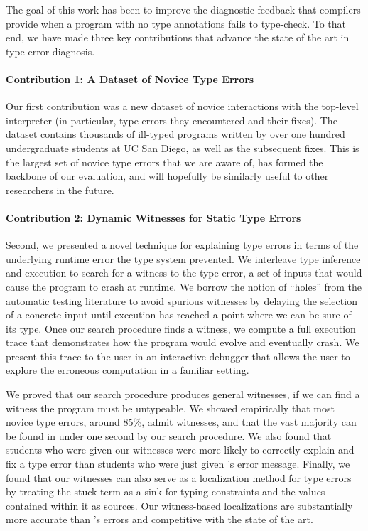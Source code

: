 The goal of this work has been to improve the diagnostic feedback that
compilers provide when a program with no type annotations fails to type-check.
%
To that end, we have made three key contributions that advance the state
of the art in type error diagnosis.

\paragraph{Contribution 1: A Dataset of Novice Type Errors}
Our first contribution was a new dataset of novice interactions with the
\ocaml top-level interpreter (in particular, type errors they
encountered and their fixes).
%
The dataset contains thousands of ill-typed programs written by over one
hundred undergraduate students at UC San Diego, as well as the
subsequent fixes.
%
This is the largest set of novice type errors that we are aware of, has
formed the backbone of our evaluation, and will hopefully be similarly
useful to other researchers in the future.

\paragraph{Contribution 2: Dynamic Witnesses for Static Type Errors}
Second, we presented a novel technique for explaining type errors in
terms of the underlying runtime error the type system prevented.
%
We interleave type inference and execution to search for a witness to
the type error, a set of inputs that would cause the program to crash
at runtime.
%
We borrow the notion of ``holes'' from the automatic testing literature
to avoid spurious witnesses by delaying the selection of a concrete
input until execution has reached a point where we can be sure of its
type.
%
Once our search procedure finds a witness, we compute a full execution
trace that demonstrates how the program would evolve and eventually
crash.
%
We present this trace to the user in an interactive debugger that allows
the user to explore the erroneous computation in a familiar setting.

We proved that our search procedure produces general witnesses, \ie if
we can find a witness the program must be untypeable.
%
We showed empirically that most novice type errors, around 85\%, admit
witnesses, and that the vast majority can be found in under one second
by our search procedure.
%
We also found that students who were given our witnesses were more
likely to correctly explain and fix a type error than students who were
just given \ocaml's error message.
%
Finally, we found that our witnesses can also serve as a localization
method for type errors by treating the stuck term as a sink for typing
constraints and the values contained within it as sources.
%
Our witness-based localizations are substantially more accurate than
\ocaml's errors and competitive with the state of the art.

